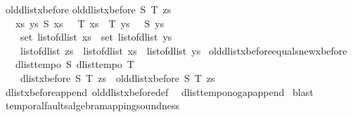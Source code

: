 \begin{isabellebody}
\begin{isamarkuptext}
\end{isamarkuptext}\isamarkuptrue%
\isamarkupfalse%
%
\isamarkuptrue%
\isamarkupfalse%
\ old{\isacharunderscore}dlist{\isacharunderscore}xbefore\isanewline
{}\isanewline
{\isachardoublequoteopen}old{\isacharunderscore}dlist{\isacharunderscore}xbefore\ S\ T\ zs\ {\isasymequiv}\ \isanewline
\ \ {\isacharparenleft}{\isasymexists}\ xs\ ys{\isachardot}\ S\ xs\ {\isasymand}\ {\isasymnot}\ T\ xs\ {\isasymand}\ T\ ys\ {\isasymand}\ {\isasymnot}\ S\ ys\ {\isasymand}\ \isanewline
\ \ \ \ set\ {\isacharparenleft}list{\isacharunderscore}of{\isacharunderscore}dlist\ xs{\isacharparenright}\ {\isasyminter}\ set\ {\isacharparenleft}list{\isacharunderscore}of{\isacharunderscore}dlist\ ys{\isacharparenright}\ {\isacharequal}\ {\isacharbraceleft}{\isacharbraceright}\ {\isasymand}\ \isanewline
\ \ \ \ list{\isacharunderscore}of{\isacharunderscore}dlist\ zs\ {\isacharequal}\ {\isacharparenleft}list{\isacharunderscore}of{\isacharunderscore}dlist\ xs{\isacharparenright}\ {\isacharat}\ {\isacharparenleft}list{\isacharunderscore}of{\isacharunderscore}dlist\ ys{\isacharparenright}{\isacharparenright}{\isachardoublequoteclose}\isanewline
\isanewline
{}\isamarkupfalse%
\ old{\isacharunderscore}dlist{\isacharunderscore}xbefore{\isacharunderscore}equals{\isacharunderscore}new{\isacharunderscore}xbefore{\isacharcolon}\isanewline
\ \ {\isachardoublequoteopen}{\isasymlbrakk}\ dlist{\isacharunderscore}tempo{}\ S{\isacharsemicolon}\ dlist{\isacharunderscore}tempo{}\ T\ {\isasymrbrakk}\ {\isasymLongrightarrow}\ \isanewline
\ \ \ \ dlist{\isacharunderscore}xbefore\ S\ T\ zs\ {\isacharequal}\ old{\isacharunderscore}dlist{\isacharunderscore}xbefore\ S\ T\ zs{\isachardoublequoteclose}\isanewline
%
\isadelimproof
%
\endisadelimproof
%
\isatagproof
{}\isamarkupfalse%
\ dlist{\isacharunderscore}xbefore{\isacharunderscore}append\ old{\isacharunderscore}dlist{\isacharunderscore}xbefore{\isacharunderscore}def\ \isanewline
{}\isamarkupfalse%
\ dlist{\isacharunderscore}tempo{\isacharunderscore}{}{\isacharunderscore}no{\isacharunderscore}gap{\isacharunderscore}append\isanewline
{}\isamarkupfalse%
\ blast%
\endisatagproof
{\isafoldproof}%
%
\isadelimproof
%
\endisadelimproof
%
\isamarkuptrue%
\isamarkupfalse%
\ temporal{\isacharunderscore}faults{\isacharunderscore}algebra{\isacharunderscore}mapping{\isacharunderscore}soundness{\isacharcolon}\ \isanewline

\end{isabellebody}
